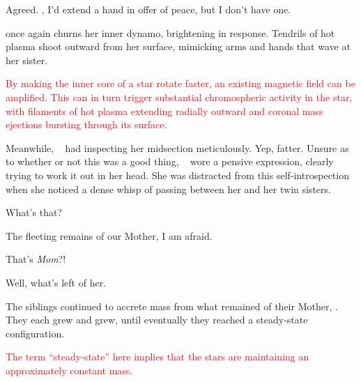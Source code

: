 \documentclass[main.tex]{subfiles}
\begin{document}
\par \Taygete Agreed.  \rmalcyone, I'd extend a hand in offer of peace, but I don't have one.

\par \nar \rmtaygete once again churns her inner dynamo, brightening in response.  Tendrils of hot plasma shoot outward from her surface, mimicking arms and hands that wave at her sister.

\begin{tcolorbox}[sharp corners, colback=red!30, colframe=red!80!blue, title=Magnetic Fields and Dynamos]
\par \textcolor{red} {By making the inner core of a star rotate faster, an existing magnetic field can be amplified.   This can in turn trigger substantial chromospheric activity in the star, with filaments of hot plasma extending radially outward and coronal mass ejections bursting through its surface.}  
\end{tcolorbox}

\par \nar Meanwhile, \rmcelaeno~ had inspecting her midsection meticulously.  Yep, fatter.  Unsure as to whether or not this was a good thing, \rmcelaeno~ wore a pensive expression, clearly trying to work it out in her head.  She was distracted from this self-introspection when she noticed a dense whisp of \Pleione passing between her and her twin sisters.  

\par \Celaeno What's that?

\par \Maia The fleeting remains of our Mother, I am afraid.

\par \Electra That's \textit{Mom}?!

\par \Maia Well, what's left of her.

\par \nar The siblings continued to accrete mass from what remained of their Mother, \rmpleione.  They each grew and grew, until eventually they reached a steady-state configuration.

\begin{tcolorbox}[sharp corners, colback=red!30, colframe=red!80!blue, title=Steady-State]
\par \textcolor{red} {The term ``steady-state'' here implies that the stars are maintaining an approximately constant mass.} 
\end{tcolorbox}
\end{document}
